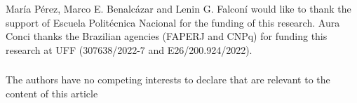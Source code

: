 \documentclass[runningheads]{llncs}
\begin{document}
\begin{credits}
  \subsubsection{\ackname} María Pérez, Marco E. Benalcázar and Lenin
  G. Falconí would like to thank the support of Escuela Politécnica
  Nacional for the funding of this research. Aura Conci thanks the
  Brazilian agencies (FAPERJ and CNPq) for funding this research at
  UFF (307638/2022-7 and E26/200.924/2022).


  \subsubsection{\discintname}
  The authors have no competing interests to declare that are relevant
  to the content of this article
\end{credits}
% 
%
%


%




\end{document}
